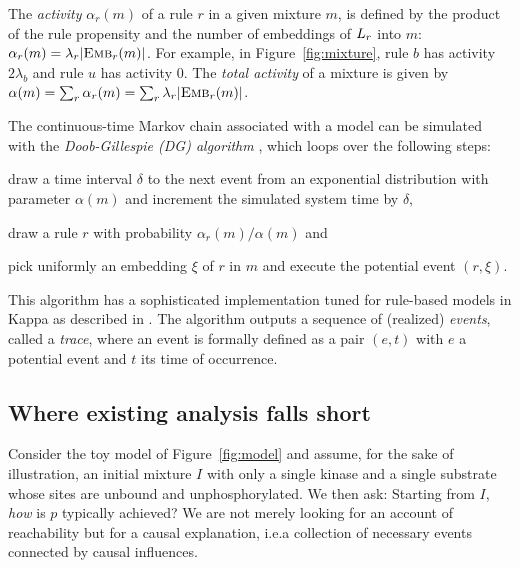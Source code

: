 The \emph{activity} $\alpha_r(m)$ of a rule $r$ in a given mixture $m$,
is defined by the product of the rule propensity and the number of
embeddings of $L_{r}$ into $m$:
$\alpha_r(m)=\lambda_r|{\textsc{Emb}}_{r}(m)|$. For example, in
Figure~\ref{fig:mixture}, rule $b$ has activity $2\lambda_b$ and rule
$u$ has activity $0$. The \emph{total activity} of a mixture is given
by $\alpha(m)=\sum_r\alpha_r(m)=\sum_r\lambda_r|{\textsc{Emb}}_{r}(m)|$.

The continuous-time Markov chain associated with a model can be
simulated with the \emph{Doob-Gillespie (DG) algorithm}
\cite{gillespie1977exact}, which loops over the
following steps:
\begin{inparaenum}[(1)]
\item draw a time interval $\delta$ to the next event from an
  exponential distribution with parameter $\alpha(m)$ and increment
  the simulated system time by $\delta$,
\item draw a rule $r$ with probability $\alpha_r(m)/\alpha(m)$ and
\item pick uniformly an embedding $\xi$ of $r$ in $m$ and execute the
  potential event $(r, \xi)$.
\end{inparaenum}
This algorithm has a sophisticated implementation tuned for rule-based
models in Kappa as described in
\cite{DanosEtAl-APLAS07,BoutillierEK17}. The algorithm outputs a sequence of (realized)
\emph{events}, called a \emph{trace}, where an event is formally
defined as a pair $(e, t)$ with $e$ a potential event and $t$ its time
of occurrence.

\longversion{}

\subsection{Where existing analysis falls short}
\label{subsec:dumb-story}


Consider the toy model of Figure~\ref{fig:model} and assume, for the
sake of illustration, an initial mixture $I$ with only a single kinase
and a single substrate whose sites are unbound and
unphosphorylated. We then ask: Starting from $I$, \emph{how} is $p$
typically achieved? We are not merely looking for an account of
reachability but for a causal explanation, i.e.\@ a collection of
necessary events connected by causal influences.

